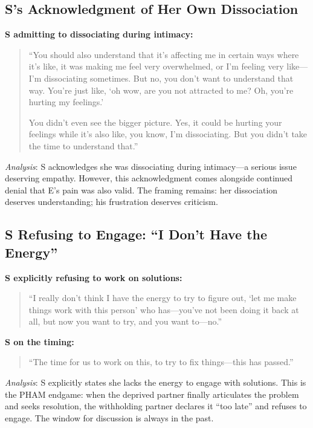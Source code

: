 \documentclass[12pt,openany]{book}
\numberwithin{equation}{chapter}
\begin{document}
\subsection{S's Acknowledgment of Her Own Dissociation}

\textbf{S admitting to dissociating during intimacy:}
\begin{quote}
``You should also understand that it's affecting me in certain ways where it's like, it was making me feel very overwhelmed, or I'm feeling very like---I'm dissociating sometimes. But no, you don't want to understand that way. You're just like, `oh wow, are you not attracted to me? Oh, you're hurting my feelings.'

You didn't even see the bigger picture. Yes, it could be hurting your feelings while it's also like, you know, I'm dissociating. But you didn't take the time to understand that.''
\end{quote}

\textit{Analysis}: S acknowledges she was dissociating during intimacy---a serious issue deserving empathy. However, this acknowledgment comes alongside continued denial that E's pain was also valid. The framing remains: her dissociation deserves understanding; his frustration deserves criticism.

\subsection{S Refusing to Engage: ``I Don't Have the Energy''}

\textbf{S explicitly refusing to work on solutions:}
\begin{quote}
``I really don't think I have the energy to try to figure out, `let me make things work with this person' who has---you've not been doing it back at all, but now you want to try, and you want to---no.''
\end{quote}

\textbf{S on the timing:}
\begin{quote}
``The time for us to work on this, to try to fix things---this has passed.''
\end{quote}

\textit{Analysis}: S explicitly states she lacks the energy to engage with solutions. This is the PHAM endgame: when the deprived partner finally articulates the problem and seeks resolution, the withholding partner declares it ``too late'' and refuses to engage. The window for discussion is always in the past.
\end{document}
